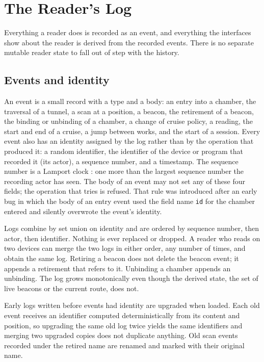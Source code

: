 \documentclass[11pt]{article}
\theoremstyle{remark}
\begin{document}
\section{The Reader's Log}
\label{sec:log}

Everything a reader does is recorded as an event, and everything the interfaces show about the reader is derived from the recorded events. There is no separate mutable reader state to fall out of step with the history.

\subsection{Events and identity}

An event is a small record with a type and a body: an entry into a chamber, the traversal of a tunnel, a scan at a position, a beacon, the retirement of a beacon, the binding or unbinding of a chamber, a change of cruise policy, a reading, the start and end of a cruise, a jump between works, and the start of a session. Every event also has an identity assigned by the log rather than by the operation that produced it: a random identifier, the identifier of the device or program that recorded it (its actor), a sequence number, and a timestamp. The sequence number is a Lamport clock \cite{lamport1978}: one more than the largest sequence number the recording actor has seen. The body of an event may not set any of these four fields; the operation that tries is refused. That rule was introduced after an early bug in which the body of an entry event used the field name \texttt{id} for the chamber entered and silently overwrote the event's identity.

Logs combine by set union on identity and are ordered by sequence number, then actor, then identifier. Nothing is ever replaced or dropped. A reader who reads on two devices can merge the two logs in either order, any number of times, and obtain the same log. Retiring a beacon does not delete the beacon event; it appends a retirement that refers to it. Unbinding a chamber appends an unbinding. The log grows monotonically even though the derived state, the set of live beacons or the current route, does not.

Early logs written before events had identity are upgraded when loaded. Each old event receives an identifier computed deterministically from its content and position, so upgrading the same old log twice yields the same identifiers and merging two upgraded copies does not duplicate anything. Old scan events recorded under the retired name are renamed and marked with their original name.
\end{document}
